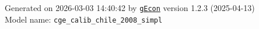 \documentclass[10pt,a4paper]{article}
\numberwithin{equation}{section}
\begin{document}
\begin{landscape}
\begin{flushleft}{\large
Generated  on 2026-03-03 14:40:42 by \href{http://gecon.r-forge.r-project.org/}{\texttt{gEcon}} version 1.2.3 (2025-04-13)\\
Model name: \verb+cge_calib_chile_2008_simpl+
}\end{flushleft}


\end{landscape}

\end{document}
